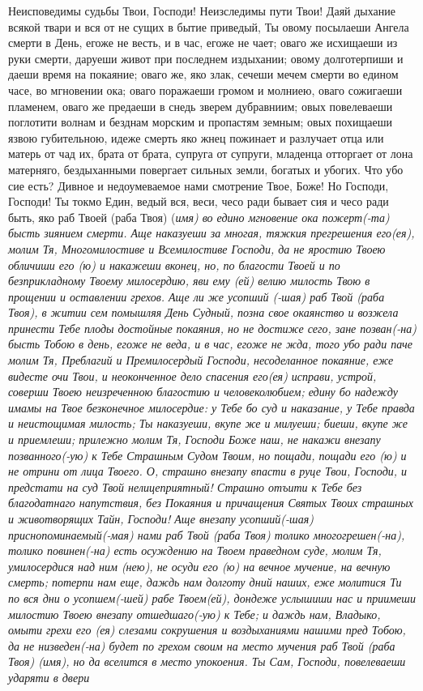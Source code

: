 \mychapterending

 


Неисповедимы судьбы Твои, Господи! Неизследимы пути Твои! Даяй дыхание всякой твари и вся от не сущих в бытие приведый, Ты овому посылаеши Ангела смерти в День, егоже не весть, и в час, егоже не чает; оваго же исхищаеши из руки смерти, даруеши живот при последнем издыхании; овому долготерпиши и даеши время на покаяние; оваго же, яко злак, сечеши мечем смерти во едином часе, во мгновении ока; оваго поражаеши громом и молниею, оваго сожигаеши пламенем, оваго же предаеши в снедь зверем дубравниим; овых повелеваеши поглотити волнам и безднам морским и пропастям земным; овых похищаеши язвою губительною, идеже смерть яко жнец пожинает и разлучает отца или матерь от чад их, брата от брата, супруга от супруги, младенца отторгает от лона матерняго, бездыханными повергает сильных земли, богатых и убогих. Что убо сие есть? Дивное и недоумеваемое нами смотрение Твое, Боже! Но Господи, Господи! Ты токмо Един, ведый вся, веси, чесо ради бывает сия и чесо ради быть, яко раб Твоей (раба Твоя) (\itshape имя\normalfont{}) во едино мгновение ока пожерт(-та) бысть зиянием смерти. Аще наказуеши за многая, тяжкия прегрешения его(ея), молим Тя, Многомилостиве и Всемилостиве Господи, да не яростию Твоею обличиши его (ю) и накажеши вконец, но, по благости Твоей и по безприкладному Твоему милосердию, яви ему (ей) велию милость Твою в прощении и оставлении грехов. Аще ли же усопший (-шая) раб Твой (раба Твоя), в житии сем помышляя День Судный, позна свое окаянство и возжела принести Тебе плоды достойные покаяния, но не достиже сего, зане позван(-на) бысть Тобою в день, егоже не веда, и в час, егоже не жда, того убо ради паче молим Тя, Преблагий и Премилосердый Господи, несоделанное покаяние, еже видесте очи Твои, и неоконченное дело спасения его(ея) исправи, устрой, соверши Твоею неизреченною благостию и человеколюбием; едину бо надежду имамы на Твое безконечное милосердие: у Тебе бо суд и наказание, у Тебе правда и неистощимая милость; Ты наказуеши, вкупе же и милуеши; биеши, вкупе же и приемлеши; прилежно молим Тя, Господи Боже наш, не накажи внезапу позванного(-ую) к Тебе Страшным Судом Твоим, но пощади, пощади его (ю) и не отрини от лица Твоего. О, страшно внезапу впасти в руце Твои, Господи, и предстати на суд Твой нелицеприятный! Страшно отъити к Тебе без благодатнаго напутствия, без Покаяния и причащения Святых Твоих страшных и животворящих Тайн, Господи! Аще внезапу усопший(-шая) приснопоминаемый(-мая) нами раб Твой (раба Твоя) толико многогрешен(-на), толико повинен(-на) есть осуждению на Твоем праведном суде, молим Тя, умилосердися над ним (нею), не осуди его (ю) на вечное мучение, на вечную смерть; потерпи нам еще, даждь нам долготу дний наших, еже молитися Ти по вся дни о усопшем(-шей) рабе Твоем(ей), дондеже услышиши нас и приимеши милостию Твоею внезапу отшедшаго(-ую) к Тебе; и даждь нам, Владыко, омыти грехи его (ея) слезами сокрушения и воздыханиями нашими пред Тобою, да не низведен(-на) будет по грехом своим на место мучения раб Твой (раба Твоя) (имя), но да вселится в место упокоения. Ты Сам, Господи, повелеваеши ударяти в двери 